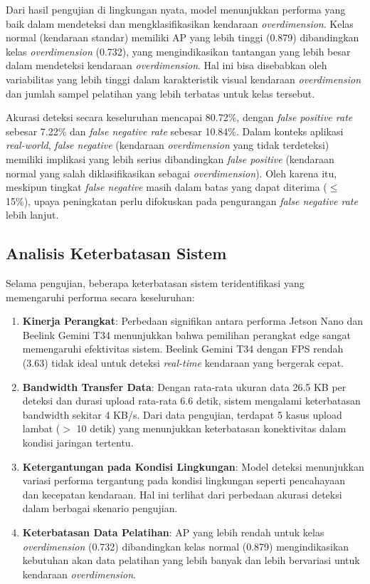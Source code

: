 Dari hasil pengujian di lingkungan nyata, model menunjukkan performa yang baik dalam mendeteksi dan mengklasifikasikan kendaraan \emph{overdimension}. Kelas normal (kendaraan standar) memiliki AP yang lebih tinggi (0.879) dibandingkan kelas \emph{overdimension} (0.732), yang mengindikasikan tantangan yang lebih besar dalam mendeteksi kendaraan \emph{overdimension}. Hal ini bisa disebabkan oleh variabilitas yang lebih tinggi dalam karakteristik visual kendaraan \emph{overdimension} dan jumlah sampel pelatihan yang lebih terbatas untuk kelas tersebut.

Akurasi deteksi secara keseluruhan mencapai 80.72\%, dengan \emph{false positive rate} sebesar 7.22\% dan \emph{false negative rate} sebesar 10.84\%. Dalam konteks aplikasi \emph{real-world}, \emph{false negative} (kendaraan \emph{overdimension} yang tidak terdeteksi) memiliki implikasi yang lebih serius dibandingkan \emph{false positive} (kendaraan normal yang salah diklasifikasikan sebagai \emph{overdimension}). Oleh karena itu, meskipun tingkat \emph{false negative} masih dalam batas yang dapat diterima ($\leq$ 15\%), upaya peningkatan perlu difokuskan pada pengurangan \emph{false negative rate} lebih lanjut.

\subsection{Analisis Keterbatasan Sistem}

Selama pengujian, beberapa keterbatasan sistem teridentifikasi yang memengaruhi performa secara keseluruhan:

\begin{enumerate}[nolistsep]
    \item \textbf{Kinerja Perangkat}: Perbedaan signifikan antara performa Jetson Nano dan Beelink Gemini T34 menunjukkan bahwa pemilihan perangkat edge sangat memengaruhi efektivitas sistem. Beelink Gemini T34 dengan FPS rendah (3.63) tidak ideal untuk deteksi \emph{real-time} kendaraan yang bergerak cepat.
    \item \textbf{Bandwidth Transfer Data}: Dengan rata-rata ukuran data 26.5 KB per deteksi dan durasi upload rata-rata 6.6 detik, sistem mengalami keterbatasan bandwidth sekitar 4 KB/s. Dari data pengujian, terdapat 5 kasus upload lambat ($>$ 10 detik) yang menunjukkan keterbatasan konektivitas dalam kondisi jaringan tertentu.
    \item \textbf{Ketergantungan pada Kondisi Lingkungan}: Model deteksi menunjukkan variasi performa tergantung pada kondisi lingkungan seperti pencahayaan dan kecepatan kendaraan. Hal ini terlihat dari perbedaan akurasi deteksi dalam berbagai skenario pengujian.
    \item \textbf{Keterbatasan Data Pelatihan}: AP yang lebih rendah untuk kelas \emph{overdimension} (0.732) dibandingkan kelas normal (0.879) mengindikasikan kebutuhan akan data pelatihan yang lebih banyak dan lebih bervariasi untuk kendaraan \emph{overdimension}.
\end{enumerate}


